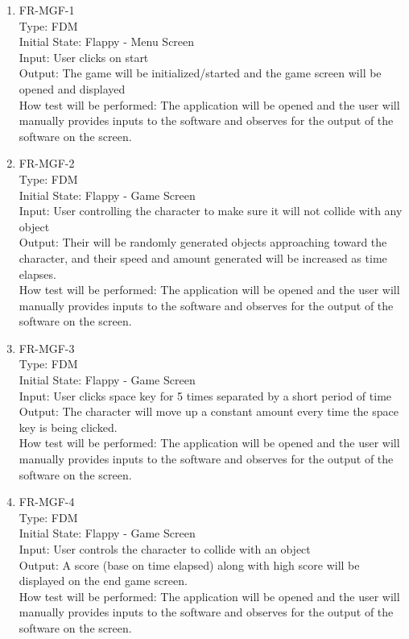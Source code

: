 \documentclass[12pt, titlepage]{article}
\begin{document}
\begin{enumerate}

\item{FR-MGF-1\\}
Type: FDM\\
Initial State: Flappy - Menu Screen\\
Input: User clicks on start\\
Output: The game will be initialized/started and the game screen will be opened and displayed\\
How test will be performed: The application will be opened and the user will manually provides inputs to the software and observes for the output of the software on the screen.\\

\item{FR-MGF-2\\}
Type: FDM\\
Initial State: Flappy - Game Screen\\
Input: User controlling the character to make sure it will not collide with any object\\
Output: Their will be randomly generated objects approaching toward the character, and their speed and amount generated will be increased as time elapses.\\
How test will be performed: The application will be opened and the user will manually provides inputs to the software and observes for the output of the software on the screen.\\

\item{FR-MGF-3\\}
Type: FDM\\
Initial State: Flappy - Game Screen\\
Input: User clicks space key for 5 times separated by a short period of time\\
Output: The character will move up a constant amount every time the space key is being clicked.\\
How test will be performed: The application will be opened and the user will manually provides inputs to the software and observes for the output of the software on the screen.\\

\item{FR-MGF-4\\}
Type: FDM\\
Initial State: Flappy - Game Screen\\
Input: User controls the character to collide with an object\\
Output: A score (base on time elapsed) along with high score will be displayed on the end game screen.\\
How test will be performed: The application will be opened and the user will manually provides inputs to the software and observes for the output of the software on the screen.\\


\end{enumerate}
\end{document}

